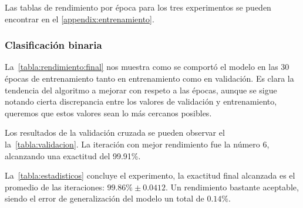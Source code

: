 Las tablas de rendimiento por época para los tres experimentos se pueden
encontrar en el \autoref{appendix:entrenamiento}.

\subsubsection{Clasificación binaria}

La~\autoref{tabla:rendimiento:final} nos muestra como se comportó el modelo
en las 30 épocas de entrenamiento tanto en entrenamiento como en validación. Es
clara la tendencia del algoritmo a mejorar con respeto a las épocas, aunque se
sigue notando cierta discrepancia entre los valores de validación y
entrenamiento, queremos que estos valores sean lo más cercanos posibles.

Los resultados de la validación cruzada se pueden observar el
la~\autoref{tabla:validacion}. La iteración con mejor rendimiento fue la número
6, alcanzando una exactitud del 99.91\%.

\begin{table}[H]
    \centering
    \caption{Resultados de la validación cruzada binaria}
    \label{tabla:validacion}
    \end{table}

La~\autoref{tabla:estadisticos} concluye el experimento, la exactitud final
alcanzada es el promedio de las iteraciones: $99.86\% \pm 0.0412$. Un
rendimiento bastante aceptable, siendo el error de generalización del modelo un
total de $0.14\%$.

